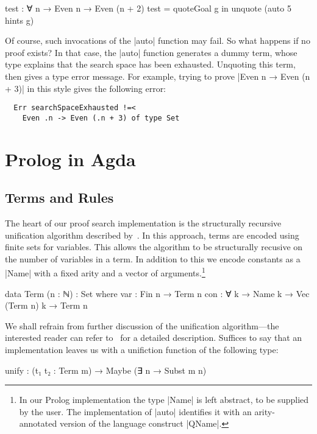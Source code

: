 \documentclass[preprint]{sigplanconf}
\begin{document}
\begin{code}
  test : ∀ {n} → Even n → Even (n + 2)
  test = quoteGoal g in unquote (auto 5 hints g)
\end{code}

Of course, such invocations of the |auto| function may fail. So what happens
if no proof exists? In that case, the |auto| function generates a dummy term,
whose type explains that the search space has been exhausted. Unquoting this
term, then gives a type error message. For example, trying to prove |Even n →
Even (n + 3)| in this style gives the following error:

\begin{verbatim}
  Err searchSpaceExhausted !=<
    Even .n -> Even (.n + 3) of type Set
\end{verbatim}



\section{Prolog in Agda}
\label{sec:prolog}

\subsection{Terms and Rules}

The heart of our proof search implementation is the structurally recursive
unification algorithm described by~\citet{mcbride}. In this approach, terms
are encoded using finite sets for variables. This allows the algorithm to
be structurally recusive on the number of variables in a term. In addition
to this we encode constants as a |Name| with a fixed arity and a vector of
arguments.\footnote{
  In our Prolog implementation the type |Name| is left abstract, to be
  supplied by the user. The implementation of |auto| identifies it with
  an arity-annotated version of the language construct |QName|.
}

\begin{code}
  data Term (n : ℕ) : Set where
    var  : Fin n → Term n
    con  : ∀ {k} → Name k → Vec (Term n) k → Term n
\end{code}

We shall refrain from further discussion of the unification algorithm---the
interested reader can refer to~\cite{mcbride} for a detailed description.
Suffices to say that an implementation leaves us with a unifiction function
of the following type:

\begin{spec}
  unify : (t₁ t₂ : Term m) → Maybe (∃ n → Subst m n)
\end{spec}
\end{document}
